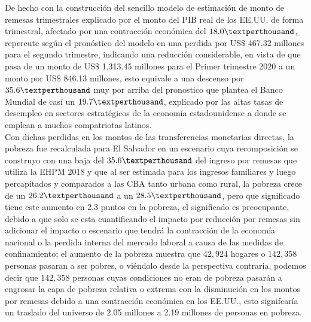 De hecho con la construcción del sencillo modelo de estimación de monto de remesas trimestrales explicado por el monto del PIB real de los EE.UU. de forma trimestral, afectado por una contracción económica del $18.0 \textperthousand$, repercute según el pronóstico del modelo en una perdida por US$\$$ 467.32 millones para el segundo trimestre, indicando una reducción considerable, en vista de que pasa de un monto de US$\$$ 1,313.45 millones para el Primer trimestre 2020 a un monto por US$\$$ 846.13 millones, esto equivale a una descenso por $35.6 \textperthousand$ muy por arriba del pronostico que plantea el Banco Mundial de casí un $19.7 \textperthousand$, explicado por las altas tasas de desempleo en sectores estratégicos de la economía estadounidense a donde se emplean a muchos compatriotas latinos.\\
    
Con dichas perdidas en los montos de las transferencias monetarias directas, la pobreza fue recalculada para El Salvador en un escenario cuya recomposición se construyo con una baja del $35.6 \textperthousand$ del ingreso por remesas que utiliza la EHPM 2018 y que al ser estimada para los ingresos familiares y luego percapitados y comparados a las CBA tanto urbana como rural, la pobreza crece de un $26.2 \textperthousand$ a un $28.5 \textperthousand$, pero que significado tiene este aumento en 2.3 puntos en la pobreza, el significado es preocupante, debido a que solo se esta cuantificando el impacto por reducción por remesas sin adicionar el impacto o escenario que tendrá la contracción de la economía nacional o la perdida interna del mercado laboral a causa de las medidas de confinamiento; el aumento de la pobreza muestra que $42,924$ hogares o $142,358$ personas pasaran a ser pobres, o viéndolo desde la perspectiva contraria, podemos decir que  $142,358$ personas cuyas condiciones no eran de pobreza pasarán a engrosar la capa de pobreza relativa o extrema con la disminución en los montos por remesas debido a una contracción económica en los EE.UU., esto signifcaría un traslado del universo de 2.05 millones a  2.19 millones de personas en pobreza. \\

